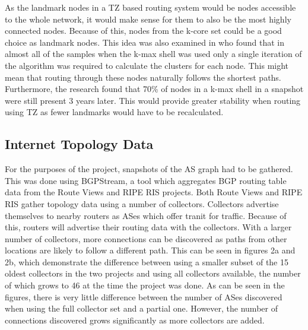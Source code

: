 \documentclass{mpaper}
\begin{document}
As the landmark nodes in a TZ based routing system would be nodes accessible to the whole network, it would make sense for them to also be the most highly connected nodes. Because of this, nodes from the k-core set could be a good choice as landmark nodes. This idea was also examined in \cite{strowes} who found that in almost all of the samples when the k-max shell was used only a single iteration of the algorithm was required to calculate the clusters for each node. This might mean that routing through these nodes naturally follows the shortest paths. Furthermore, the research found that 70\% of nodes in a k-max shell in a snapshot were still present 3 years later. This would provide greater stability when routing using TZ as fewer landmarks would have to be recalculated. 

\subsection{Internet Topology Data}
For the purposes of the project, snapshots of the AS graph had to be gathered. This was done using BGPStream, a tool which aggregates BGP routing table data from the Route Views and RIPE RIS projects. Both Route Views and RIPE RIS gather topology data using a number of collectors. Collectors advertise themselves to nearby routers as ASes which offer tranit for traffic. Because of this, routers will advertise their routing data with the collectors. With a larger number of collectors, more connections can be discovered as paths from other locations are likely to follow a different path. This can be seen in figures 2a and 2b, which demonstrate the difference between using a smaller subset of the 15 oldest collectors in the two projects and using all collectors available, the number of which grows to 46 at the time the project was done. As can be seen in the figures, there is very little difference between the number of ASes discovered when using the full collector set and a partial one. However, the number of connections discovered grows significantly as more collectors are added.
\end{document}
